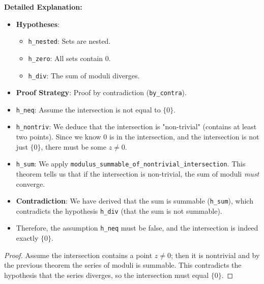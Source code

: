 \noindent
\textbf{Detailed Explanation:}
\begin{itemize}
    \item \textbf{Hypotheses}:
        \begin{itemize}
            \item \texttt{h\_nested}: Sets are nested.
            \item \texttt{h\_zero}: All sets contain 0.
            \item \texttt{h\_div}: The sum of moduli diverges.
        \end{itemize}
    \item \textbf{Proof Strategy}: Proof by contradiction (\texttt{by\_contra}).
    \item \texttt{h\_neq}: Assume the intersection is not equal to $\{0\}$.
    \item \texttt{h\_nontriv}: We deduce that the intersection is "non-trivial" (contains at least two points). Since we know $0$ is in the intersection, and the intersection is not just $\{0\}$, there must be some $z \ne 0$.
    \item \texttt{h\_sum}: We apply \texttt{modulus\_summable\_of\_nontrivial\_intersection}. This theorem tells us that if the intersection is non-trivial, the sum of moduli \emph{must} converge.
    \item \textbf{Contradiction}: We have derived that the sum is summable (\texttt{h\_sum}), which contradicts the hypothesis \texttt{h\_div} (that the sum is not summable).
    \item Therefore, the assumption \texttt{h\_neq} must be false, and the intersection is indeed exactly $\{0\}$.
\end{itemize}

\begin{proof}
Assume the intersection contains a point $z\neq0$; then it is nontrivial and by the previous theorem the series of moduli is summable. This contradicts the hypothesis that the series diverges, so the intersection must equal $\{0\}$.
\end{proof}
